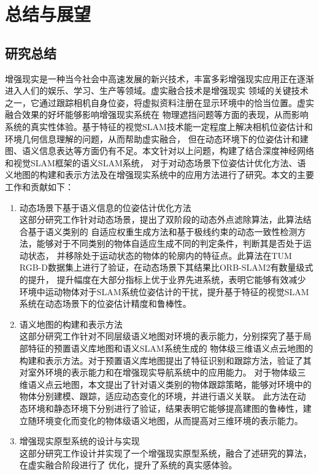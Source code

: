 \chapter{总结与展望}\label{chap:6}
\section{研究总结}
增强现实是一种当今社会中高速发展的新兴技术，丰富多彩增强现实应用正在逐渐进入人们的娱乐、学习、生产等领域。虚实融合技术是增强现实
领域的关键技术之一，它通过跟踪相机自身位姿，将虚拟资料注册在显示环境中的恰当位置。虚实融合效果的好坏能够影响增强现实系统在
物理遮挡问题等方面的表现，从而影响系统的真实性体验。基于特征的视觉SLAM技术能一定程度上解决相机位姿估计和环境几何信息理解的问题，从而帮助虚实融合，
但在动态环境下的位姿估计和建图、语义信息表达等方面仍有不足。本文针对以上问题，构建了结合深度神经网络和视觉SLAM框架的语义SLAM系统，
对于对动态场景下位姿估计优化方法、语义地图的构建和表示方法及在增强现实系统中的应用方法进行了研究。本文的主要工作和贡献如下：
{
\setlist[enumerate]{}%
\begin{enumerate}[nosep]
    \item 动态场景下基于语义信息的位姿估计优化方法\\这部分研究工作针对动态场景，提出了双阶段的动态外点滤除算法，此算法结合基于语义类别的
    自适应权重生成方法和基于极线约束的动态一致性检测方法，能够对于不同类别的物体自适应生成不同的判定条件，判断其是否处于运动状态，
    并移除处于运动状态的物体的轮廓内的特征点。此算法在TUM RGB-D数据集上进行了验证，在动态场景下其结果比ORB-SLAM2有数量级式的提升，
    提升幅度在大部分指标上优于业界先进系统，表明它能够有效减少环境中运动物体对于SLAM系统位姿估计的干扰，提升基于特征的视觉SLAM系统在动态场景下的位姿估计精度和鲁棒性。
    \item 语义地图的构建和表示方法\\这部分研究工作针对不同层级语义地图对环境的表示能力，分别探究了基于局部特征的预置语义库地图和语义SLAM系统生成的
    物体级三维语义点云地图的构建和表示方法。对于预置语义库地图提出了特征识别和跟踪方法，验证了其对室外环境的表示能力和在增强现实导航系统中的应用能力。
    对于物体级三维语义点云地图，本文提出了针对语义类别的物体跟踪策略，能够对环境中的物体分别建模、跟踪，适应动态变化的环境，并进行语义关联。
    此方法在动态环境和静态环境下分别进行了验证，结果表明它能够提高建图的鲁棒性，建立随环境变化而变化的物体级语义地图，从而提高对三维环境的表示能力。
    \item 增强现实原型系统的设计与实现\\这部分研究工作设计并实现了一个增强现实原型系统，融合了述研究的算法，在虚实融合阶段进行了
    优化，提升了系统的真实感体验。
\end{enumerate}
}

